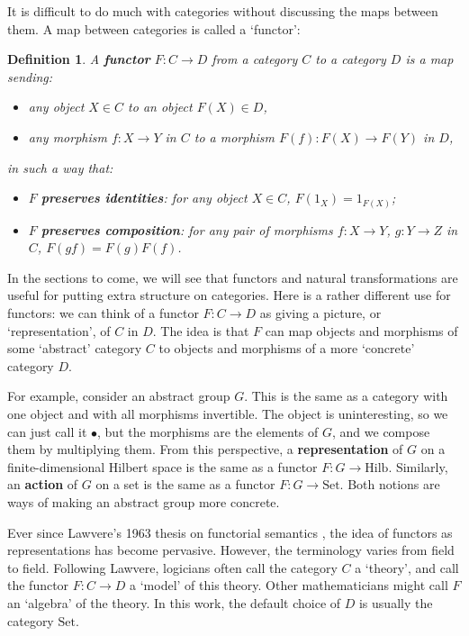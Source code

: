 \documentclass[12pt,twoside,openright]{report}
\newtheorem{definition}[thm]{Definition}
\newcommand{\Hilb}{\mathrm{Hilb}}
\newcommand{\Set}{\mathrm{Set}}
\newcommand{\maps}{\colon}
\begin{document}
It is difficult to do much with categories without discussing the maps between them.  A map between categories is called a `functor':

\begin{definition} 
A {\bf functor} $F\maps C\to D$ from a category $C$ to a category $D$
is a map sending:
\begin{itemize}
\item any object $X \in C$ to an object $F(X) \in D$,
\item any morphism $f\maps X\to Y$ in $C$ to a morphism $F(f)\maps F(X)\to F(Y)$ 
in $D$,
\end{itemize}
in such a way that:
\begin{itemize}
\item $F$ {\bf preserves identities}: for any object $X \in C$,
$F(1_X) = 1_{F(X)}$;
\item $F$ {\bf preserves composition}: for any pair of morphisms $f \maps X \to Y$, $g \maps Y \to Z$ in $C$,
$F(gf) = F(g) F(f)$.
\end{itemize}
\end{definition}

In the sections to come, we will see that functors and natural transformations are useful for putting extra structure on categories. Here is a rather different use for functors: we can think of a functor $F \maps C \to D$ as giving a picture, or `representation', of $C$ in $D$.  The idea is that $F$ can map objects and morphisms of some `abstract' category $C$ to objects and morphisms of a more `concrete' category $D$.  

For example, consider an abstract group $G$.  This is the same as a category with one object and with all morphisms invertible. The object is uninteresting, so we can just call it $\bullet$, but the morphisms are the elements of $G$, and we compose them by multiplying them.  From this perspective, a {\bf representation} of $G$ on a finite-dimensional Hilbert space is the same as a functor 
$F \maps G \to \Hilb$.  Similarly, an {\bf action} of $G$ 
on a set is the same as a functor $F \maps G \to \Set$.  Both notions are ways of making an abstract group more concrete.

Ever since Lawvere's 1963 thesis on functorial semantics
\cite{Lawvere}, the idea of functors as representations has become pervasive.  However, the terminology varies from field to field. Following Lawvere, logicians often call the category $C$ a `theory', and call the functor $F \maps C \to D$ a `model' of this theory. Other mathematicians might call $F$ an `algebra' of the theory. In this work, the default choice of $D$ is usually the category
$\Set$.  
\end{document}
